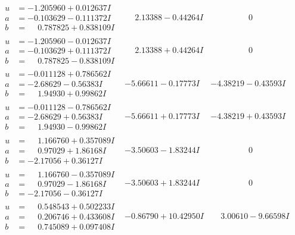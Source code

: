 \documentclass[1p]{elsarticle_modified}
\theoremstyle{definition}
\begin{document}
$$\begin{array}{c|c|c}
\begin{aligned}
u &= -1.205960 + 0.012637 I \\
a &= -0.103629 - 0.111372 I \\
b &= \phantom{-}0.787825 + 0.838109 I\end{aligned}
 & \phantom{-}2.13388 - 0.44264 I & \phantom{-0.000000 } 0 \\ \hline\begin{aligned}
u &= -1.205960 - 0.012637 I \\
a &= -0.103629 + 0.111372 I \\
b &= \phantom{-}0.787825 - 0.838109 I\end{aligned}
 & \phantom{-}2.13388 + 0.44264 I & \phantom{-0.000000 } 0 \\ \hline\begin{aligned}
u &= -0.011128 + 0.786562 I \\
a &= -2.68629 - 0.56383 I \\
b &= \phantom{-}1.94930 + 0.99862 I\end{aligned}
 & -5.66611 - 0.17773 I & -4.38219 - 0.43593 I \\ \hline\begin{aligned}
u &= -0.011128 - 0.786562 I \\
a &= -2.68629 + 0.56383 I \\
b &= \phantom{-}1.94930 - 0.99862 I\end{aligned}
 & -5.66611 + 0.17773 I & -4.38219 + 0.43593 I \\ \hline\begin{aligned}
u &= \phantom{-}1.166760 + 0.357089 I \\
a &= \phantom{-}0.97029 + 1.86168 I \\
b &= -2.17056 + 0.36127 I\end{aligned}
 & -3.50603 - 1.83244 I & \phantom{-0.000000 } 0 \\ \hline\begin{aligned}
u &= \phantom{-}1.166760 - 0.357089 I \\
a &= \phantom{-}0.97029 - 1.86168 I \\
b &= -2.17056 - 0.36127 I\end{aligned}
 & -3.50603 + 1.83244 I & \phantom{-0.000000 } 0 \\ \hline\begin{aligned}
u &= \phantom{-}0.548543 + 0.502233 I \\
a &= \phantom{-}0.206746 + 0.433608 I \\
b &= \phantom{-}0.745089 + 0.097408 I\end{aligned}
 & -0.86790 + 10.42950 I & \phantom{-}3.00610 - 9.66598 I \\ \hline\begin{aligned}

\end{aligned}
\end{array}$$
\end{document}
